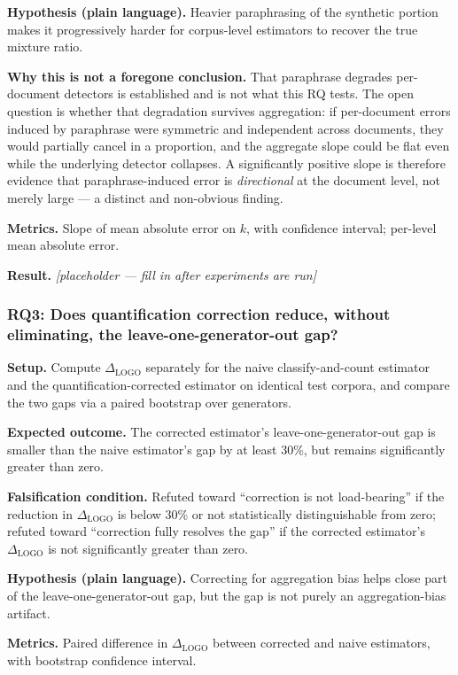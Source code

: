 \documentclass[11pt]{article}
\newcommand{\ph}{\textit{[placeholder --- fill in after experiments are run]}}
\begin{document}
\textbf{Hypothesis (plain language).} Heavier paraphrasing of the synthetic portion makes it progressively harder for corpus-level estimators to recover the true mixture ratio.

\textbf{Why this is not a foregone conclusion.} That paraphrase degrades per-document detectors is established \citep{DipperParaphrase2023,ReliablyDetectable2023} and is not what this RQ tests. The open question is whether that degradation survives aggregation: if per-document errors induced by paraphrase were symmetric and independent across documents, they would partially cancel in a proportion, and the aggregate slope could be flat even while the underlying detector collapses. A significantly positive slope is therefore evidence that paraphrase-induced error is \emph{directional} at the document level, not merely large --- a distinct and non-obvious finding.

\textbf{Metrics.} Slope of mean absolute error on $k$, with confidence interval; per-level mean absolute error.

\textbf{Result.} \ph

\subsubsection{RQ3: Does quantification correction reduce, without eliminating, the leave-one-generator-out gap?}
\textbf{Setup.} Compute $\Delta_{\text{LOGO}}$ separately for the naive classify-and-count estimator and the quantification-corrected estimator on identical test corpora, and compare the two gaps via a paired bootstrap over generators.

\textbf{Expected outcome.} The corrected estimator's leave-one-generator-out gap is smaller than the naive estimator's gap by at least 30\%, but remains significantly greater than zero.

\textbf{Falsification condition.} Refuted toward ``correction is not load-bearing'' if the reduction in $\Delta_{\text{LOGO}}$ is below 30\% or not statistically distinguishable from zero; refuted toward ``correction fully resolves the gap'' if the corrected estimator's $\Delta_{\text{LOGO}}$ is not significantly greater than zero.

\textbf{Hypothesis (plain language).} Correcting for aggregation bias helps close part of the leave-one-generator-out gap, but the gap is not purely an aggregation-bias artifact.

\textbf{Metrics.} Paired difference in $\Delta_{\text{LOGO}}$ between corrected and naive estimators, with bootstrap confidence interval.
\end{document}
